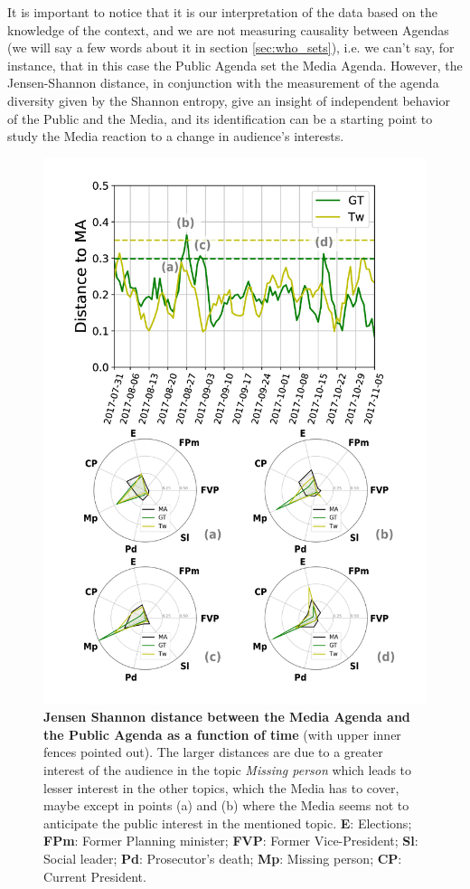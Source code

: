 \documentclass[a4paper, 12pt]{article}
\begin{document}
\par It is important to notice that it is our interpretation of the data based on the knowledge of the context, and  we are not measuring causality between Agendas (we will say a few words about it in section \ref{sec:who_sets}), i.e. we can't say, for instance, that in this case the Public Agenda set the Media Agenda. 
However, the Jensen-Shannon distance, in conjunction with the measurement of the agenda diversity given by the Shannon entropy, give an insight of independent behavior of the Public and the Media, and its identification can be a starting point to study the Media reaction to a change in audience's interests.
 
\begin{figure}[h]
\centering
\includegraphics[height = 0.75\textheight]{images/Fig4.pdf}
\caption{\textbf{Jensen Shannon distance between the Media Agenda and the Public Agenda as a function of time} (with upper inner fences pointed out). The larger distances are due to a greater interest of the audience in the topic \emph{Missing person} which leads to lesser interest in the other topics, which the Media has to cover, maybe except in points (a) and (b) where the Media seems not to anticipate the public interest in the mentioned topic. \textbf{E}: Elections; \textbf{FPm}: Former Planning minister; \textbf{FVP}: Former Vice-President; \textbf{Sl}: Social leader; \textbf{Pd}: Prosecutor's death; \textbf{Mp}: Missing person; \textbf{CP}: Current President.}
\label{fig:jensen_shannon_gt}
\end{figure}
\end{document}
